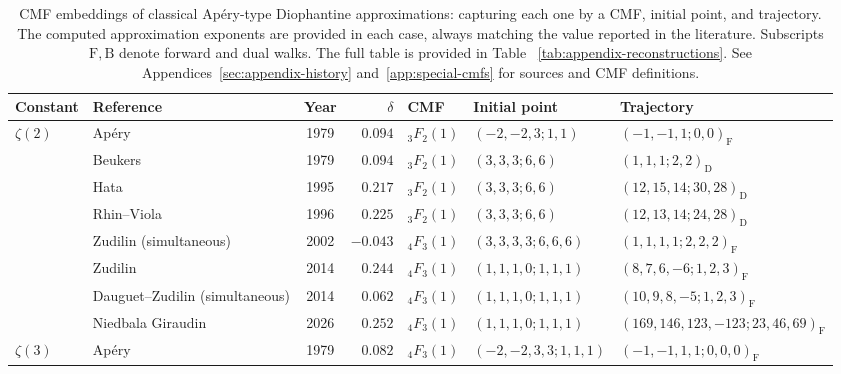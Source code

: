 \documentclass[oneside,english,11pt]{amsart}
\begin{document}
\label{subsec:all-classical-recovery}
\begingroup
\fontsize{8.5}{10}\selectfont
\setlength{\tabcolsep}{2.2pt}
\renewcommand{\arraystretch}{1.18}
\begin{longtable}{@{}l
>{\raggedright\arraybackslash}p{2.75cm}
c r l
>{\raggedright\arraybackslash}p{2.3cm}
>{\raggedright\arraybackslash}p{3.23cm}@{}}
\caption{CMF embeddings of classical Ap\'ery-type Diophantine approximations: capturing each one by a CMF, initial point, and trajectory. 
The computed approximation exponents are provided in each case, always matching the value reported in the literature. 
Subscripts $\mathrm F,\mathrm B$ denote forward and dual walks.
The full table is provided in Table ~\ref{tab:appendix-reconstructions}.
See Appendices~\ref{sec:appendix-history} and~\ref{app:special-cmfs}
for sources and CMF definitions.}\label{tab:all-reconstructions}\\
\toprule
Constant & Reference & Year & $\delta$ & CMF & Initial point & Trajectory \\
\midrule
$\zeta(2)$ & Ap\'ery \cite{apery1979irrationalite} & 1979 & $0.094$
& ${}_3F_2(1)$ & $(-2,-2,3;1,1)$ & $(-1,-1,1;0,0)_{\mathrm F}$ \\
 & Beukers \cite{beukers1979note} & 1979 & $0.094$
& ${}_3F_2(1)$ & $(3,3,3;6,6)$ & $(1,1,1;2,2)_{\mathrm D}$ \\
 & Hata \cite{hata1995beukers} & 1995 & $0.217$
& ${}_3F_2(1)$ & $(3,3,3;6,6)$ & $(12,15,14;30,28)_{\mathrm D}$ \\
 & Rhin--Viola \cite{rhin1996permutation} & 1996 & $0.225$
& ${}_3F_2(1)$ & $(3,3,3;6,6)$ & $(12,13,14;24,28)_{\mathrm D}$ \\
 & Zudilin \cite{zudilin2002thirdOrder} (simultaneous) & 2002 & $-0.043$
& ${}_4F_3(1)$ & $(3,3,3,3;6,6,6)$ & $(1,1,1,1;2,2,2)_{\mathrm F}$ \\
 & Zudilin \cite{zudilin2014zeta2} & 2014 & $0.244$
& ${}_4F_3(1)$ & $(1,1,1,0;1,1,1)$ & $(8,7,6,-6;1,2,3)_{\mathrm F}$ \\
 & Dauguet--Zudilin \cite{dauguetZudilin2014} (simultaneous) & 2014 & $0.062$
& ${}_4F_3(1)$ & $(1,1,1,0;1,1,1)$ & $(10,9,8,-5;1,2,3)_{\mathrm F}$ \\
 & Niedbala Giraudin \cite{giraudin2026zeta2} & 2026 & $0.252$
& ${}_4F_3(1)$ & $(1,1,1,0;1,1,1)$ & $(169,146,123,-123;\allowbreak 23,46,69)_{\mathrm F}$ \\
\addlinespace
$\zeta(3)$ & Ap\'ery \cite{apery1979irrationalite} & 1979 & $0.082$
& ${}_4F_3(1)$ & $(-2,-2,3,3;\allowbreak 1,1,1)$ & $(-1,-1,1,1;0,0,0)_{\mathrm F}$ \\

\end{longtable}
\end{document}
